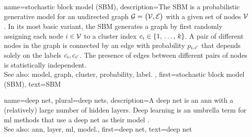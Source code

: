 {name={stochastic block model (SBM)},
	description={The SBM is a 
		probabilistic generative \gls{model} for an undirected \gls{graph} $\mathcal{G} = \big( \mathcal{V}, \mathcal{E} \big)$ 
		with a given set of nodes $\mathcal{V}$ \cite{AbbeSBM2018}. In its most basic variant, 
		the SBM generates a \gls{graph} by first randomly assigning each node $i \in \mathcal{V}$ to 
		a \gls{cluster} index $c_{i} \in \{1, \,\ldots, \,k\}$. A pair of different nodes in the 
		\gls{graph} is connected by an edge with \gls{probability} $p_{i,i'}$ that depends 
		solely on the \glspl{label} $c_{i}, c_{i'}$. 
		The presence of edges between different pairs of 
		nodes is statistically independent.
					\\ 
		See also: \gls{model}, \gls{graph}, \gls{cluster}, \gls{probability}, \gls{label}. },
	first={stochastic block model (SBM)},
	text={SBM} 
}

{name={deep net}, plural={deep nets},
	description={A deep net is an \gls{ann} with a (relatively) large number of 
		hidden \glspl{layer}. Deep learning is an umbrella term for \gls{ml} methods that use a deep 
		net as their \gls{model} \cite{Goodfellow-et-al-2016}.
				\\ 
		See also: \gls{ann}, \gls{layer}, \gls{ml}, \gls{model}.},
	first={deep net},
	text={deep net} 
}



